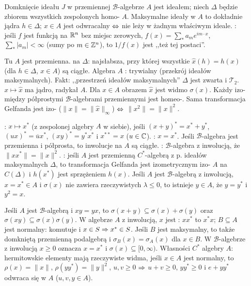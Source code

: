 Domknięcie  ideału $J$ w przemiennej $\mathscr B$-algebrze $A$ jest ideałem; niech $\Delta$ będzie zbiorem wszystkich zespolonych homo- $A$.
Maksymalne ideały w $A$ to dokładnie jądra $h \in \Delta$; $x \in A$ jest odwracalny $\Leftrightarrow$ nie leży w żadnym właściwym ideale.
: jeśli $f$ jest funkcją na $\mathbb{R}^n$ bez miejsc zerowych, $f(x) = \sum_* a_m e^{im\cdot x}$, $\sum_* |a_m| <\infty$ (sumy po $m \in \mathbb{Z}^n$), to $1/f(x)$ jest ,,też tej postaci''.

Tu $A$ jest  przemienna.
 na $\Delta$: najsłabsza, przy której wszystkie $\widehat x(h) = h(x)$ (dla $h \in \Delta$, $x \in A$) są ciągłe.
Algebra $A$ : trywialny  (przekrój ideałów maksymalnych).
Fakt: ,,przestrzeń ideałów maksymalnych'' $\Delta$ jest zwarta i $\mathcal T_2$.
 $x \mapsto \widehat x$ ma jądro, radykał $A$.
Dla $x \in A$ obrazem $\widehat x$ jest widmo $\sigma(x)$.
Każdy izo- między półprostymi $\mathscr B$-algebrami przemiennymi jest homeo-.
Sama transformacja Gelfanda jest izo- ($\|x\| = \|\widehat x\|_\infty$) $\Leftrightarrow$ $\|x^2\|= \|x\|^2$.

:  $x \mapsto x^*$ (z zespolonej algebry $A$ w siebie), jeśli $(x+y)^* = x^* + y^*$, $(ux)^*  =\overline{u}x^*$, $(xy)^* = y^*x^*$ i $x^{**} = x$ ($u \in \mathbb{C}$).
: $x = x^*$.
Jeśli $\mathscr B$-algebra jest przemienna i półprosta, to inwolucje na $A$ są ciągłe.
: $\mathscr B$-algebra z inwolucją, że $\|xx^*\| = \|x\|^2$.
: jeśli $A$ jest przemienną $C^*$-algebrą z p. ideałów maksymalnych $\Delta$, to transformacja Gelfanda jest izometrycznym izo- $A$ na $C(\Delta)$ i $h(x^*)$ jest sprzężeniem $h(x)$.
Jeśli $A$ jest $\mathscr B$-algebrą z inwolucją, $x = x^* \in A$ i $\sigma(x)$ nie zawiera rzeczywistych $\lambda \le 0$, to istnieje $y \in A$, że $y = y^*$ i $y^2 = x$. %

Jeśli  $A$ jest $\mathscr B$-algebrą i $xy=yx$, to $\sigma(x+y) \subseteq \sigma(x) + \sigma(y)$ oraz $\sigma(xy) \subseteq \sigma(x) \sigma(y)$.
W algebrze $A$ z inwolucją, $x$ jest : $xx^*$ to $x^*x$; $B \subseteq A$ jest normalny: komutuje i $x \in S \Rightarrow x^* \in S$.
Jeśli $B$ jest maksymalny, to także domkniętą przemienną podalgebrą i $\sigma_B(x) = \sigma_A(x)$ dla $x \in B$.
W $\mathscr B$-algebrze z inwolucją $x \ge 0$ oznacza $x = x^*$ i $\sigma(x) \subseteq [0, \infty)$.
Własności $C^*$ algebry $A$: hermitowskie elementy mają rzeczywiste widma, jeśli $x \in A$ jest normalny, to $\rho(x) = \|x\|$, $\rho(y y^*) = \|y\|^2$, $u,v \ge 0$ $\Rightarrow$ $u+v \ge 0$, $yy^* \ge 0$ i $e+yy^*$ odwraca się w $A$ ($u, v, y \in A$).

